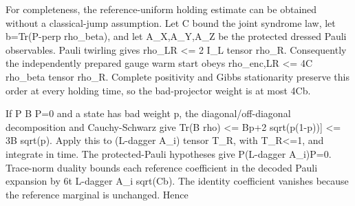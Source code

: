 \documentclass[
]{article}
\begin{document}
For completeness, the reference-uniform holding estimate can be obtained
without a classical-jump assumption. Let C bound the joint syndrome law,
let b=Tr(P-perp rho\_beta), and let A\_X,A\_Y,A\_Z be the protected
dressed Pauli observables. Pauli twirling gives rho\_LR \textless= 2
I\_L tensor rho\_R. Consequently the independently prepared gauge warm
start obeys rho\_enc,LR \textless= 4C rho\_beta tensor rho\_R. Complete
positivity and Gibbs stationarity preserve this order at every holding
time, so the bad-projector weight is at most 4Cb.

If P B P=0 and a state has bad weight p, the
d\allowbreak{}i\allowbreak{}a\allowbreak{}g\allowbreak{}o\allowbreak{}n\allowbreak{}a\allowbreak{}l\allowbreak{}/\allowbreak{}o\allowbreak{}f\allowbreak{}f\allowbreak{}-\allowbreak{}d\allowbreak{}i\allowbreak{}a\allowbreak{}g\allowbreak{}o\allowbreak{}n\allowbreak{}a\allowbreak{}l
decomposition and Cauchy-Schwarz give \textbar Tr(B rho)\textbar{}
\textless= \textbar\textbar B\textbar\textbar{[}p+2 sqrt(p(1-p)){]}
\textless= 3\textbar\textbar B\textbar\textbar{} sqrt(p). Apply this to
(L-dagger A\_i) tensor T\_R, with
\textbar\textbar T\_R\textbar\textbar\textless=1, and integrate in time.
The protected-Pauli hypotheses give P(L-dagger A\_i)P=0. Trace-norm
duality bounds each reference coefficient in the decoded Pauli expansion
by 6t \textbar\textbar L-dagger A\_i\textbar\textbar{} sqrt(Cb). The
identity coefficient vanishes because the reference marginal is
unchanged. Hence
\end{document}
